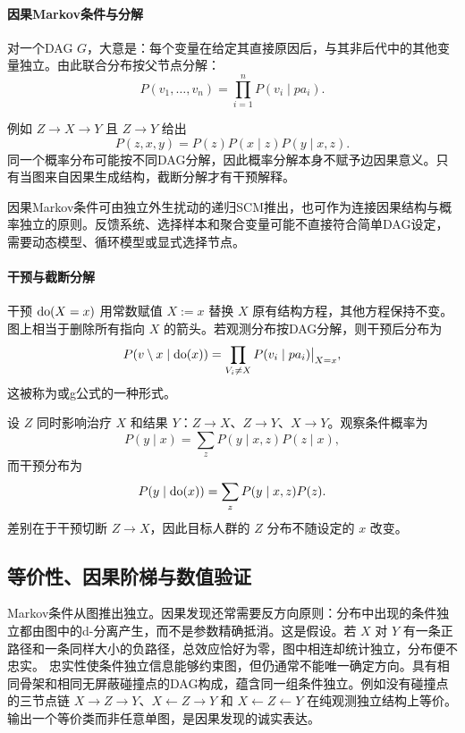 \paragraph{因果Markov条件与分解}

对一个DAG $G$，大意是：每个变量在给定其直接原因后，与其非后代中的其他变量独立。由此联合分布按父节点分解：
\[
P(v_1,\ldots,v_n)=\prod_{i=1}^{n}P(v_i\mid pa_i).
\]

例如 $Z\rightarrow X\rightarrow Y$ 且 $Z\rightarrow Y$ 给出
\[
P(z,x,y)=P(z)P(x\mid z)P(y\mid x,z).
\]
同一个概率分布可能按不同DAG分解，因此概率分解本身不赋予边因果意义。只有当图来自因果生成结构，截断分解才有干预解释。

因果Markov条件可由独立外生扰动的递归SCM推出，也可作为连接因果结构与概率独立的原则。反馈系统、选择样本和聚合变量可能不直接符合简单DAG设定，需要动态模型、循环模型或显式选择节点。

\paragraph{干预与截断分解}

干预 $\operatorname{do}(X=x)$ 用常数赋值 $X:=x$ 替换 $X$ 原有结构方程，其他方程保持不变。图上相当于删除所有指向 $X$ 的箭头。若观测分布按DAG分解，则干预后分布为
\[
P(v\setminus x\mid\operatorname{do}(x))=
\prod_{V_i\neq X}P(v_i\mid pa_i)\big|_{X=x},
\]
这被称为或g公式的一种形式。

设 $Z$ 同时影响治疗 $X$ 和结果 $Y$：$Z\rightarrow X$、$Z\rightarrow Y$、$X\rightarrow Y$。观察条件概率为
\[
P(y\mid x)=\sum_z P(y\mid x,z)P(z\mid x),
\]
而干预分布为
\[
P(y\mid\operatorname{do}(x))=\sum_z P(y\mid x,z)P(z).
\]
差别在于干预切断 $Z\rightarrow X$，因此目标人群的 $Z$ 分布不随设定的 $x$ 改变。

\subsection{等价性、因果阶梯与数值验证}

Markov条件从图推出独立。因果发现还常需要反方向原则：分布中出现的条件独立都由图中的d-分离产生，而不是参数精确抵消。这是假设。若 $X$ 对 $Y$ 有一条正路径和一条同样大小的负路径，总效应恰好为零，图中相连却统计独立，分布便不忠实。
忠实性使条件独立信息能够约束图，但仍通常不能唯一确定方向。具有相同骨架和相同无屏蔽碰撞点的DAG构成，蕴含同一组条件独立。例如没有碰撞点的三节点链 $X\rightarrow Z\rightarrow Y$、$X\leftarrow Z\rightarrow Y$ 和 $X\leftarrow Z\leftarrow Y$ 在纯观测独立结构上等价。输出一个等价类而非任意单图，是因果发现的诚实表达\parencite{vermapearl1990}。

